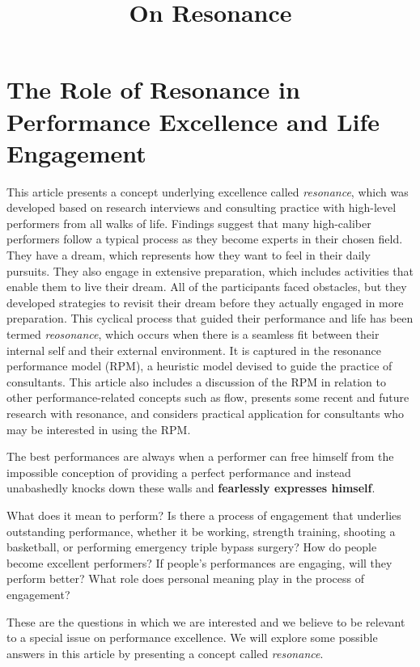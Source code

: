 \documentclass[ebook,12pt,oneside,openany]{memoir}
\begin{document}
\title{On Resonance}
\maketitle
\section{The Role of Resonance in Performance Excellence and Life Engagement}

This article presents a concept underlying excellence called \textit{resonance},
which was developed based on research interviews and consulting practice with high-level performers from all walks of life.
Findings suggest that many high-caliber performers follow a typical process as they become experts in their chosen field.
They have a dream, which represents how they want to feel in their daily pursuits.
They also engage in extensive preparation, which includes activities that enable them to live their dream.
All of the participants faced obstacles, but they developed strategies to revisit their dream before they actually engaged in more preparation.
This cyclical process that guided their performance and life has been termed \textit{reosonance}, 
which occurs when there is a seamless fit between their internal self and their external environment.
It is captured in the resonance performance model (RPM), a heuristic model devised to guide the practice of consultants.
This article also includes a discussion of the RPM in relation to other performance-related concepts such as flow, presents some recent and future research with resonance, and 
considers practical application for consultants who may be interested in using the RPM.

\begin{displayquote}
    The best performances are always when a performer can free himself from the impossible conception of providing a perfect performance and instead unabashedly knocks down these walls
    and \textbf{fearlessly expresses himself}.
\end{displayquote}

What does it mean to perform? Is there a process of engagement that underlies outstanding performance, whether it be working, strength training, shooting a basketball, or performing emergency triple bypass surgery?
How do people become excellent performers? If people's performances are engaging, will they perform better? What role does personal meaning play in the process of engagement?

These are the questions in which we are interested and we believe to be relevant to a special issue on performance excellence.
We will explore some possible answers in this article by presenting a concept called \textit{resonance}.
\end{document}
